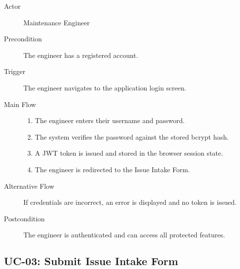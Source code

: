 \begin{description}
    \item[Actor] Maintenance Engineer
    \item[Precondition] The engineer has a registered account.
    \item[Trigger] The engineer navigates to the application login screen.
    \item[Main Flow]
        \begin{enumerate}[noitemsep]
            \item The engineer enters their username and password.
            \item The system verifies the password against the stored bcrypt hash.
            \item A JWT token is issued and stored in the browser session state.
            \item The engineer is redirected to the Issue Intake Form.
        \end{enumerate}
    \item[Alternative Flow]
        If credentials are incorrect, an error is displayed and no token is issued.
    \item[Postcondition] The engineer is authenticated and can access all protected features.
\end{description}

\subsection{UC-03: Submit Issue Intake Form\label{sec:uc03}}

